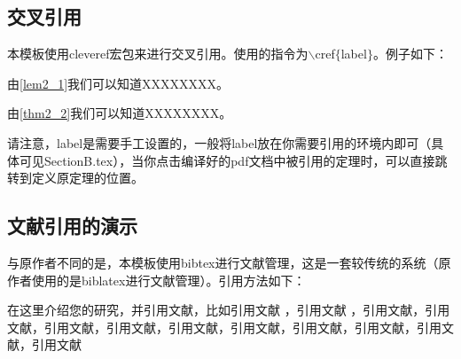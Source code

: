 \subsection{交叉引用}
\par 本模板使用cleveref宏包来进行交叉引用。使用的指令为$\backslash$cref$\{$label$\}$。例子如下：
\par 由\cref{lem2_1}我们可以知道XXXXXXXX。
\par 由\cref{thm2_2}我们可以知道XXXXXXXX。
\par 请注意，label是需要手工设置的，一般将label放在你需要引用的环境内即可（具体可见SectionB.tex），当你点击编译好的pdf文档中被引用的定理时，可以直接跳转到定义原定理的位置。

\subsection{文献引用的演示}
\par 与原作者不同的是，本模板使用bibtex进行文献管理，这是一套较传统的系统（原作者使用的是biblatex进行文献管理）。引用方法如下：
\par 在这里介绍您的研究，并引用文献，比如引用文献 \cite{knuth1984texbook} ，引用文献 \cite{lamport1986latex}，引用文献\cite{111}，引用文献\cite{222}，引用文献\cite{333}，引用文献\cite{444}，引用文献\cite{clark2017techreport}，引用文献\cite{miller2021website}，引用文献\cite{green1999misc}，引用文献\cite{lee2008phdthesis}，引用文献\cite{white2015manual}，引用文献\cite{adams2006inbook}

